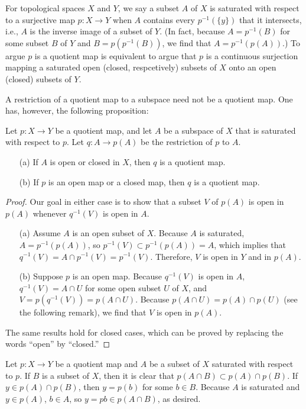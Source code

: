 For topological spaces $X$ and $Y$, we say a subset $A$ of $X$ is saturated with respect to a surjective map $p: X\rightarrow Y$ when $A$ contains every $p^{-1}(\{y\})$ that it intersects, i.e., $A$ is the inverse image of a subset of $Y$.
(In fact, because $A=p^{-1}(B)$ for some subset $B$ of $Y$ and $B=p(p^{-1}(B))$, we find that $A=p^{-1}(p(A))$.)
To argue $p$ is a quotient map is equivalent to argue that $p$ is a continuous surjection mapping a saturated open (closed, respcetively) subsets of $X$ onto an open (closed) subsets of $Y$.

A restriction of a quotient map to a subspace need not be a quotient map.
One has, however, the following proposition:
\begin{prop}
    Let $p: X\rightarrow Y$ be a quotient map, and let $A$ be a subspace of $X$ that is saturated with respect to $p$.
    Let $q: A\rightarrow p(A)$ be the restriction of $p$ to $A$.
    \begin{enumerate}
        \item[(a)]
        {
            If $A$ is open or closed in $X$, then $q$ is a quotient map.
        }
        \item[(b)]
        {
            If $p$ is an open map or a closed map, then $q$ is a quotient map.
        }
    \end{enumerate}
\end{prop}
\begin{proof}
    Our goal in either case is to show that a subset $V$ of $p(A)$ is open in $p(A)$ whenever $q^{-1}(V)$ is open in $A$.
    \begin{enumerate}
        \item[(a)]
        {
            Assume $A$ is an open subset of $X$.
            Because $A$ is saturated, $A=p^{-1}(p(A))$, so $p^{-1}(V)\subset p^{-1}(p(A))=A$, which implies that $q^{-1}(V)=A\cap p^{-1}(V)=p^{-1}(V)$.
            Therefore, $V$ is open in $Y$ and in $p(A)$.
        }
        \item[(b)]
        {
            Suppose $p$ is an open map.
            Because $q^{-1}(V)$ is open in $A$, $q^{-1}(V)=A\cap U$ for some open subset $U$ of $X$, and $V=p(q^{-1}(V))=p(A\cap U)$.
            Because $p(A\cap U)=p(A)\cap p(U)$ (see the following remark), we find that $V$ is open in $p(A)$.
        }
    \end{enumerate}
    The same results hold for closed cases, which can be proved by replacing the words ``open'' by ``closed.''
\end{proof}
\begin{rmk}
    Let $p: X\rightarrow Y$ be a quotient map and $A$ be a subset of $X$ saturated with respect to $p$.
    If $B$ is a subset of $X$, then it is clear that $p(A\cap B)\subset p(A)\cap p(B)$.
    If $y\in p(A)\cap p(B)$, then $y=p(b)$ for some $b\in B$.
    Because $A$ is saturated and $y\in p(A)$, $b\in A$, so $y=pb\in p(A\cap B)$, as desired.
\end{rmk}

